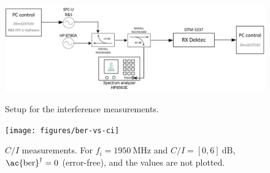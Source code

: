 \documentclass[conference,10pt,a4paper]{IEEEtran}%
\begin{document}
\begin{figure}[tb]
	\centering
	\includegraphics[width=\columnwidth]{figures/interference-dektec-setup}
	\caption{Setup for the interference measurements.}
	\label{fig:interference-dektec-setup}
	\vspace{\baselineskip}
	\texttt{[image: figures/ber-vs-ci]}
	\caption{$C/I$ measurements. For $f_i = \SI{1950}{\mega\Hz}$ and $C/I = [0,6]~\si{\deci\bel}$, $\text{\ac{ber}}^\dagger = 0$ (error-free), and the values are not plotted.}
	\label{fig:ci-meas}
\end{figure}
\end{document}
